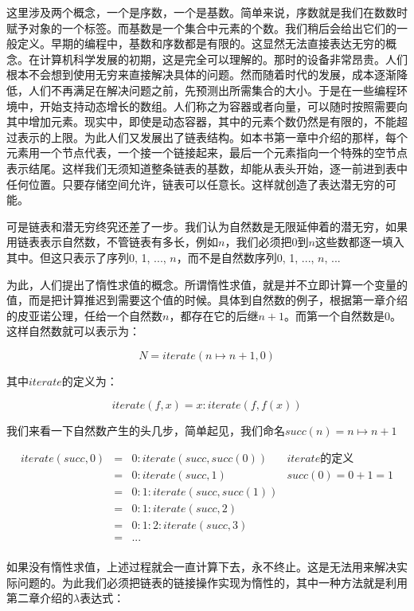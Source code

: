 \documentclass{article}
\begin{document}
这里涉及两个概念，一个是序数，一个是基数。简单来说，序数就是我们在数数时赋予对象的一个标签。而基数是一个集合中元素的个数。我们稍后会给出它们的一般定义。早期的编程中，基数和序数都是有限的。这显然无法直接表达无穷的概念。在计算机科学发展的初期，这是完全可以理解的。那时的设备非常昂贵。人们根本不会想到使用无穷来直接解决具体的问题。然而随着时代的发展，成本逐渐降低，人们不再满足在解决问题之前，先预测出所需集合的大小。于是在一些编程环境中，开始支持动态增长的数组。人们称之为容器或者向量，可以随时按照需要向其中增加元素。现实中，即使是动态容器，其中的元素个数仍然是有限的，不能超过表示的上限。为此人们又发展出了链表结构。如本书第一章中介绍的那样，每个元素用一个节点代表，一个接一个链接起来，最后一个元素指向一个特殊的空节点表示结尾。这样我们无须知道整条链表的基数，却能从表头开始，逐一前进到表中任何位置。只要存储空间允许，链表可以任意长。这样就创造了表达潜无穷的可能。

可是链表和潜无穷终究还差了一步。我们认为自然数是无限延伸着的潜无穷，如果用链表表示自然数，不管链表有多长，例如$n$，我们必须把0到$n$这些数都逐一填入其中。但这只表示了序列0, 1, ..., $n$，而不是自然数序列0, 1, ..., $n$, ...

为此，人们提出了惰性求值的概念。所谓惰性求值，就是并不立即计算一个变量的值，而是把计算推迟到需要这个值的时候。具体到自然数的例子，根据第一章介绍的皮亚诺公理，任给一个自然数$n$，都存在它的后继$n+1$。而第一个自然数是0。这样自然数就可以表示为：

\[
N = iterate(n \mapsto n + 1, 0)
\]

其中$iterate$的定义为：

\[
iterate(f, x) = x : iterate(f, f(x))
\]

我们来看一下自然数产生的头几步，简单起见，我们命名$succ(n) = n \mapsto n +1$

\[
\begin{array}{rcll}
iterate(succ, 0) & = & 0 : iterate(succ, succ(0)) & iterate\text{的定义}\\
                 & = & 0 : iterate(succ, 1) & succ(0) = 0 + 1 = 1 \\
                 & = & 0 : 1 : iterate(succ, succ(1)) & \\
                 & = & 0 : 1 : iterate(succ, 2) & \\
                 & = & 0 : 1 : 2 : iterate(succ, 3) & \\
                 & = & ... & \\
\end{array}
\]

如果没有惰性求值，上述过程就会一直计算下去，永不终止。这是无法用来解决实际问题的。为此我们必须把链表的链接操作实现为惰性的，其中一种方法就是利用第二章介绍的$\lambda$表达式：
\end{document}
